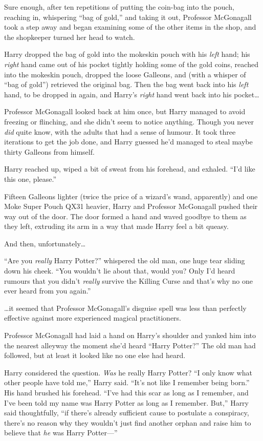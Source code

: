 Sure enough, after ten repetitions of putting the coin-bag into the
pouch, reaching in, whispering ``bag of gold,'' and taking it out,
Professor McGonagall took a step away and began examining some of the
other items in the shop, and the shopkeeper turned her head to watch.

Harry dropped the bag of gold into the mokeskin pouch with his
\emph{left} hand; his \emph{right} hand came out of his pocket tightly
holding some of the gold coins, reached into the mokeskin pouch, dropped
the loose Galleons, and (with a whisper of ``bag of gold'') retrieved
the original bag. Then the bag went back into his \emph{left} hand, to
be dropped in again, and Harry's \emph{right} hand went back into his
pocket\ldots{}

Professor McGonagall looked back at him once, but Harry managed to avoid
freezing or flinching, and she didn't seem to notice anything. Though
you never \emph{did} quite know, with the adults that had a sense of
humour. It took three iterations to get the job done, and Harry guessed
he'd managed to steal maybe thirty Galleons from himself.

Harry reached up, wiped a bit of sweat from his forehead, and exhaled.
``I'd like this one, please.''

Fifteen Galleons lighter (twice the price of a wizard's wand,
apparently) and one Moke Super Pouch QX31 heavier, Harry and Professor
McGonagall pushed their way out of the door. The door formed a hand and
waved goodbye to them as they left, extruding its arm in a way that made
Harry feel a bit queasy.

And then, unfortunately\ldots{}

``Are you \emph{really} Harry Potter?'' whispered the old man, one huge
tear sliding down his cheek. ``You wouldn't lie about that, would you?
Only I'd heard rumours that you didn't \emph{really} survive the Killing
Curse and that's why no one ever heard from you again.''

\ldots{}it seemed that Professor McGonagall's disguise spell was less
than perfectly effective against more experienced magical practitioners.

Professor McGonagall had laid a hand on Harry's shoulder and yanked him
into the nearest alleyway the moment she'd heard ``Harry Potter?'' The
old man had followed, but at least it looked like no one else had heard.

Harry considered the question. \emph{Was} he really Harry Potter? ``I
only know what other people have told me,'' Harry said. ``It's not like
I remember being born.'' His hand brushed his forehead. ``I've had this
scar as long as I remember, and I've been told my name was Harry Potter
as long as I remember. But,'' Harry said thoughtfully, ``if there's
already sufficient cause to postulate a conspiracy, there's no reason
why they wouldn't just find another orphan and raise him to believe that
\emph{he} was Harry Potter---''

